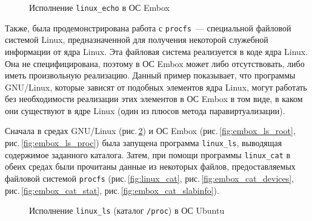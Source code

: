 \begin{figure}[H]
\caption{Исполнение \texttt{linux\_echo} в ОС Embox}
\label{fig:embox_echo}
\end{figure}

Также, была продемонстрирована работа с \texttt{procfs}~--- специальной файловой системой Linux, предназначенной для получения некоторой служебной информации от ядра Linux. Эта файловая система реализуется в коде ядра Linux. Она не специфицирована, поэтому в ОС Embox может либо отсутствовать, либо иметь произвольную реализацию. Данный пример показывает, что программы GNU/Linux, которые зависят от подобных элементов ядра Linux, могут работать без необходимости реализации этих элементов в ОС Embox в том виде, в каком они существуют в ядре Linux (один из плюсов метода паравиртуализации).

Сначала в средах GNU/Linux (рис.\,\ref{fig:linux_ls}) и ОС Embox (рис.\,\ref{fig:embox_ls_root}, рис.\,\ref{fig:embox_ls_proc}) была запущена программа \texttt{linux\_ls}, выводящая содержимое заданного каталога. Затем, при помощи программы \texttt{linux\_cat} в обеих средах были прочитаны данные из некоторых файлов, предоставляемых файловой системой \texttt{procfs} (рис.\,\ref{fig:linux_cat}, рис.\,\ref{fig:embox_cat_devices}, рис.\,\ref{fig:embox_cat_stat}, рис.\,\ref{fig:embox_cat_slabinfo}).

\begin{figure}[H]
\caption{Исполнение \texttt{linux\_ls} (каталог \texttt{/proc}) в ОС Ubuntu}
\label{fig:linux_ls}
\end{figure}

